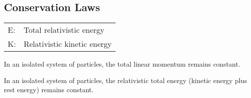 \documentclass[class=article,crop=false]{standalone}
\begin{document}
\newpage
\subsection{Conservation Laws}


\begin{tabular}{ll}
	E: & Total relativistic energy \\
	K: & Relativistic kinetic energy \\
\end{tabular}

\begin{result}
	In an isolated system of particles, the total linear momentum remains constant.
\end{result}

\begin{result}
	In an isolated system of particles, the relativistic total energy (kinetic energy plus rest energy) remains constant.
\end{result}
\end{document}
